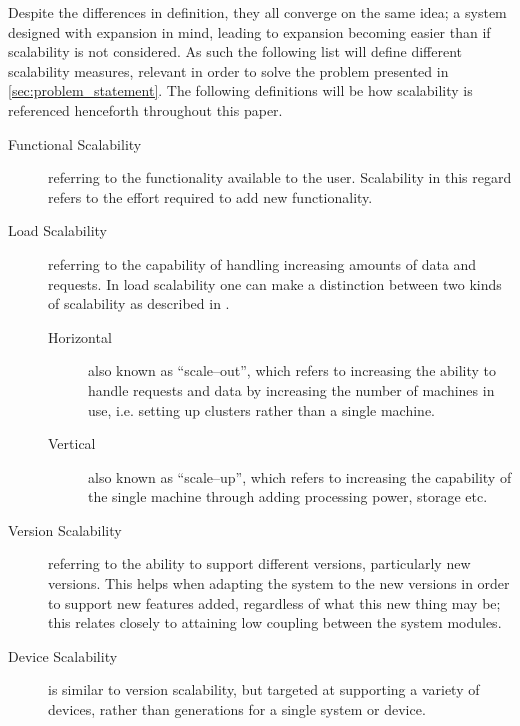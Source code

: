 Despite the differences in definition, they all converge on the same idea; a system designed with expansion in mind, leading to expansion becoming easier than if scalability is not considered.
As such the following list will define different scalability measures, relevant in order to solve the problem presented in \cref{sec:problem_statement}.
The following definitions will be how scalability is referenced henceforth throughout this paper.
\begin{description}
    \item [Functional Scalability]
        referring to the functionality available to the user.
        Scalability in this regard refers to the effort required to add new functionality.
    \item [Load Scalability]
        referring to the capability of handling increasing amounts of data and requests.
        In load scalability one can make a distinction between two kinds of scalability as described in \cite{HoriVertScale}.
        \begin{description}
            \item [Horizontal] also known as ``scale--out'', which refers to increasing the ability to handle requests and data by increasing the number of machines in use, i.e. setting up clusters rather than a single machine.
            \item [Vertical] also known as ``scale--up'', which refers to increasing the capability of the single machine through adding processing power, storage etc.
        \end{description}
    \item [Version Scalability]
        referring to the ability to support different versions, particularly new versions.
        This helps when adapting the system to the new versions in order to support new features added, regardless of what this new thing may be; this relates closely to attaining low coupling between the system modules\cite[p.~266]{coupling}.
    \item [Device Scalability]
        is similar to version scalability, but targeted at supporting a variety of devices, rather than generations for a single system or device.
\end{description}
